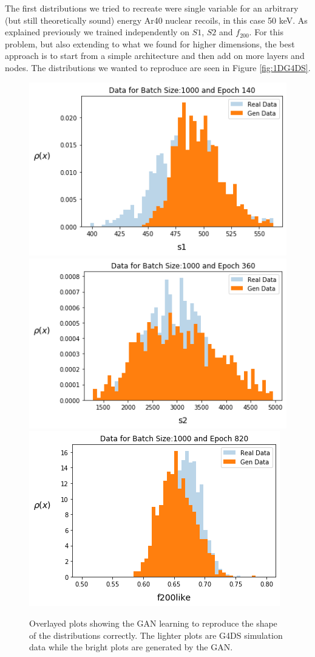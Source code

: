 \documentclass[11pt]{article} %
\begin{document}
The first distributions we tried to recreate were single variable for an arbitrary (but still theoretically sound) energy Ar40 nuclear recoils, in this case 50 keV. As explained previously we trained independently on $S1$, $S2$ and $f_{200}$. For this problem, but also extending to what we found for higher dimensions, the best approach is to start from a simple architecture and then add on more layers and nodes. The distributions we wanted to reproduce are seen in Figure \ref{fig:1DG4DS}.
\newline
\begin{figure}[H]
\centering
\includegraphics[scale=0.45]{images/1d_s1.png}
\includegraphics[scale=0.45]{images/1d_s2.png}
\includegraphics[scale=0.45]{images/1d_f200.png}
\caption{Overlayed plots showing the GAN learning to reproduce the shape of the distributions correctly. The lighter plots are G4DS simulation data while the bright plots are generated by the GAN.}
\label{fig:1DGAN}
\end{figure}
\end{document}
